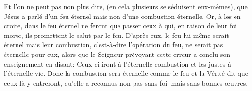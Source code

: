 Et l’on ne peut pas non plus dire,
	(en cela plusieurs se séduisent eux-mêmes),
	que Jésus a parlé d’un feu éternel mais non d’une combustion éternelle.
Or, à les en croire, dans le feu éternel ne feront que passer
	ceux à qui, en raison de leur foi morte,
	ils promettent le salut par le feu.
D’après eux, le feu lui-même serait éternel
	mais leur combustion, c’est-à-dire l’opération du feu,
	ne serait pas éternelle pour eux,
	alors que le Seigneur prévoyant cette erreur
		a conclu son enseignement en disant:
	Ceux-ci iront à l’éternelle combustion et les justes à l’éternelle vie.
Donc la combustion sera éternelle comme le feu
	et la Vérité dit que ceux-là y entreront,
	qu’elle a reconnus non pas sans foi, mais sans bonnes œuvres.
